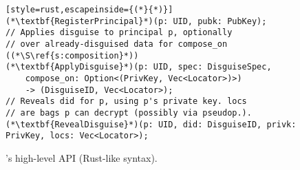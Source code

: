 \begin{figure}[t]
\begin{lstlisting}[style=rust,escapeinside={(*}{*)}]
(*\textbf{RegisterPrincipal}*)(p: UID, pubk: PubKey);
// Applies disguise to principal p, optionally
// over already-disguised data for compose_on ((*\S\ref{s:composition}*))
(*\textbf{ApplyDisguise}*)(p: UID, spec: DisguiseSpec,
    compose_on: Option<(PrivKey, Vec<Locator>)>)
    -> (DisguiseID, Vec<Locator>);
// Reveals did for p, using p's private key. locs
// are bags p can decrypt (possibly via pseudop.).
(*\textbf{RevealDisguise}*)(p: UID, did: DisguiseID, privk: PrivKey, locs: Vec<Locator>);
\end{lstlisting}
\caption{\sys's high-level API (Rust-like syntax).}
\label{f:api-high}
\end{figure}


